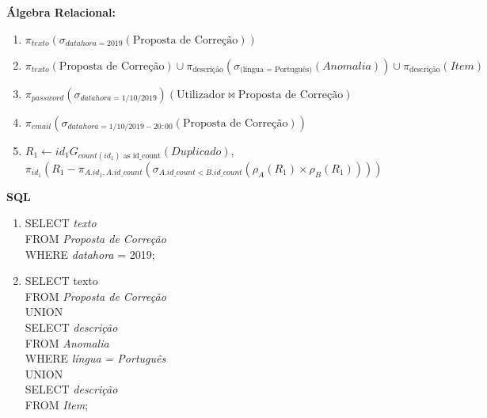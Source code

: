 \documentclass[12pt]{report}
\begin{document}
\newpage
\Large
\textbf{Álgebra Relacional: }\\

\begin{enumerate}
	\item $\pi_{texto}(\sigma_{datahora = 2019}(\text{Proposta de Correção}))$
	\item $\pi_{texto}(\text{Proposta de Correção}) \cup \pi_{\text{descrição}}(\sigma_{\text{(língua = Português)}}(Anomalia)) \cup
		\pi_{\text{descrição}}(Item)$
	\item $\pi_{password}(\sigma_{datahora = 1/10/2019})(\text{Utilizador}\bowtie\text{Proposta de Correção})$
	\item $\pi_{email}(\sigma_{datahora = 1/10/2019 - 20:00}(\text{Proposta de Correção}))$
	\item $R_{1} \gets id_{1}G_{count(id_{1}) \text{ as id\_count}}(Duplicado),$\\
		$ \pi_{id_{1}}(R_{1} - \pi_{A.id_{1}, A.id\_count}(\sigma_{A.id\_count < B.id\_count}(\rho_{A}(R_{1}) \times \rho_{B}(R_{1}))))$
\end{enumerate}

\Large
\textbf{SQL}

\begin{enumerate}
	\item SELECT \textit{texto} \\
		FROM \textit{Proposta de Correção} \\
		WHERE \textit{datahora} = 2019;
	\item SELECT texto \\
		FROM \textit{Proposta de Correção} \\
		UNION \\
		SELECT \textit{descrição} \\
		FROM \textit{Anomalia} \\
		WHERE \textit{língua = Português} \\
		UNION \\
		SELECT \textit{descrição} \\
		FROM \textit{Item};
\end{enumerate}
\end{document}
